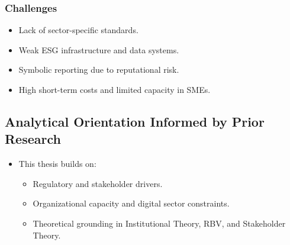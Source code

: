 \subsubsection{Challenges}
\begin{itemize}
    \item Lack of sector-specific standards.
    \item Weak ESG infrastructure and data systems.
    \item Symbolic reporting due to reputational risk.
    \item High short-term costs and limited capacity in SMEs.
\end{itemize}

\subsection{Analytical Orientation Informed by Prior Research}
\begin{itemize}
    \item This thesis builds on:
        \begin{itemize}
        \item Regulatory and stakeholder drivers.
        \item Organizational capacity and digital sector constraints.
        \item Theoretical grounding in Institutional Theory, RBV, and Stakeholder Theory.
        \end{itemize}
\end{itemize}